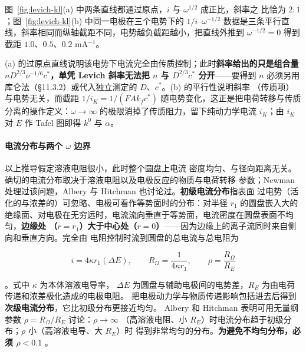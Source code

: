 \begin{obs}
图~\ref{fig:levich-kl}(a) 中两条直线都通过原点，$i$ 与 $\omega^{1/2}$ 成正比，斜率之
比恰为 $2:1$；图~\ref{fig:levich-kl}(b) 中同一电极在三个电势下的 $1/i$–$\omega^{-1/2}$
数据是三条平行直线，斜率相同而纵轴截距不同，电势越负截距越小，把直线外推到
$\omega^{-1/2}=0$ 得到截距 $1.0$、$0.5$、$0.2$ mA$^{-1}$。
\end{obs}

\begin{infer}
(a) 的过原点直线说明该电势下电流完全由传质控制；此时\textbf{斜率给出的只是组合量
$nD^{2/3}\nu^{-1/6}c^{*}$，单凭 Levich 斜率无法把 $n$ 与 $D^{2/3}c^{*}$ 分开}——要得到
$n$ 必须另用库仑法（\S 11.3.2）或代入独立测定的 $D$、$c^{*}$。(b) 的平行性说明斜率
（传质项）与电势无关，而截距 $1/i_K=1/(FAk_fc^{*})$ 随电势变化，这正是把电荷转移与传质
分离的操作定义：$\omega\to\infty$ 的极限消掉了传质阻力，留下纯动力学电流 $i_K$；由
$i_K$ 对 $E$ 作 Tafel 图即得 $k^{0}$ 与 $\alpha$。
\end{infer}

\paragraph{电流分布与两个 $\omega$ 边界} 以上推导假定溶液电阻很小，此时整个圆盘上电流
密度均匀、与径向距离无关。确切的电流分布取决于溶液电阻以及电极反应的物质与电荷转移
参数；Newman 处理过该问题，Albery 与 Hitchman 也讨论过。\textbf{初级电流分布}指表面
过电势（活化的与浓差的）可忽略、电极可看作等势面时的分布：对半径 $r_1$ 的圆盘嵌入大的
绝缘面、对电极在无穷远时，电流流向垂直于等势面，电流密度在圆盘表面不均匀，\textbf{边缘处
（$r=r_1$）大于中心处（$r=0$）}——因为边缘上的离子流同时来自侧向和垂直方向。完全由
电阻控制时流到圆盘的总电流与总电阻为

\begin{equation}
i=4\kappa r_1(\Delta E),
\qquad
R_{\Omega}=\frac{1}{4\kappa r_1},
\qquad
\rho=\frac{R_{\Omega}}{R_E}
\label{eq:rde-resistance}
\end{equation}

。式中 $\kappa$ 为本体溶液电导率，
$\Delta E$ 为圆盘与辅助电极间的电势差，$R_E$ 为由电荷传递和浓差极化造成的电极电阻。
把电极动力学与物质传递影响包括进去后得到\textbf{次级电流分布}，它比初级分布更接近均匀。
Albery 和 Hitchman 表明可用无量纲参数 $\rho=R_{\Omega}/R_E$ 讨论：$\rho\to\infty$
（高溶液电阻、小 $R_E$）时电流分布趋于初级分布；$\rho$ 小（高溶液电导、大 $R_E$）时
得到非常均匀的分布。\textbf{为避免不均匀分布，必须 $\rho<0.1$}
。

